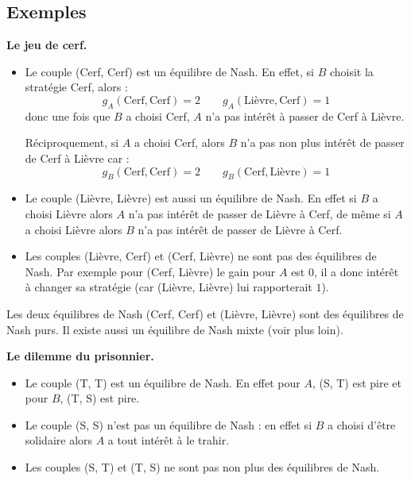 \documentclass[11pt,class=report,crop=false]{standalone}
\begin{document}


\subsection{Exemples}

\textbf{Le jeu de cerf.}




\begin{itemize}
	\item Le couple (Cerf, Cerf) est un équilibre de Nash.
	En effet, si $B$ choisit la stratégie Cerf, alors :
	$$g_A(\text{Cerf}, \text{Cerf}) = 2 \qquad g_A(\text{Lièvre}, \text{Cerf}) = 1$$
	donc une fois que $B$ a choisi Cerf, $A$ n'a pas intérêt à passer de Cerf à Lièvre.
	
	Réciproquement, si $A$ a choisi Cerf, alors $B$ n'a pas non plus intérêt de passer de Cerf à Lièvre car :
	$$g_B(\text{Cerf}, \text{Cerf}) = 2 \qquad g_B(\text{Cerf}, \text{Lièvre}) = 1$$	
	
	
	\item Le couple (Lièvre, Lièvre) est aussi un équilibre de Nash. En effet si $B$ a choisi Lièvre alors $A$ n'a pas intérêt de passer de Lièvre à Cerf, de même si $A$ a choisi Lièvre alors $B$ n'a pas intérêt de passer de Lièvre à Cerf.
	
    \item Les couples (Lièvre, Cerf) et (Cerf, Lièvre) ne sont pas des équilibres de Nash. Par exemple pour (Cerf, Lièvre) le gain pour $A$ est $0$, il a donc intérêt à changer sa stratégie (car (Lièvre, Lièvre) lui rapporterait $1$).
\end{itemize}

Les deux équilibres de Nash (Cerf, Cerf) et  (Lièvre, Lièvre) sont des équilibres de Nash purs. Il existe aussi un équilibre de Nash mixte (voir plus loin).

\bigskip
\textbf{Le dilemme du prisonnier.}



\begin{itemize}
	\item Le couple (T, T) est un équilibre de Nash. En effet pour $A$, (S, T) est pire et pour $B$, (T, S) est pire.
	\item Le couple (S, S) n'est pas un équilibre de Nash : en effet si $B$ a choisi d'être solidaire alors $A$ a tout intérêt à le trahir.
	\item Les couples (S, T) et (T, S) ne sont pas non plus des équilibres de Nash.
\end{itemize}
\end{document}
